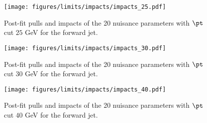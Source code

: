 \begin{figure} [!h]
 \centering
 \texttt{[image: figures/limits/impacts/impacts\_25.pdf]}\\
\caption{Post-fit pulls and impacts of the 20 nuisance parameters with $\pt$ cut $25$ GeV for the forward jet.}
\label{fig:impact25}
\end{figure}

\begin{figure} [!h]
 \centering
 \texttt{[image: figures/limits/impacts/impacts\_30.pdf]}\\
\caption{Post-fit pulls and impacts of the 20 nuisance parameters with $\pt$ cut $30$ GeV for the forward jet.}
\label{fig:impact30}
\end{figure}

\begin{figure} [!h]
 \centering
 \texttt{[image: figures/limits/impacts/impacts\_40.pdf]}\\
\caption{Post-fit pulls and impacts of the 20 nuisance parameters with $\pt$ cut $40$ GeV for the forward jet.}
\label{fig:impact40}
\end{figure}
